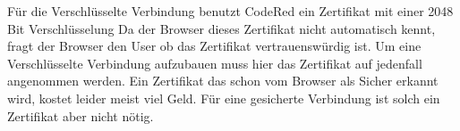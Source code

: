 Für die Verschlüsselte Verbindung benutzt CodeRed ein Zertifikat mit einer 2048 Bit Verschlüsselung Da der Browser dieses Zertifikat nicht automatisch kennt, fragt der Browser den User ob das Zertifikat vertrauenswürdig ist. Um eine Verschlüsselte Verbindung aufzubauen muss hier das Zertifikat auf jedenfall angenommen werden. Ein Zertifikat das schon vom Browser als Sicher erkannt wird, kostet leider meist viel Geld. Für eine gesicherte Verbindung ist solch ein Zertifikat aber nicht nötig. 


